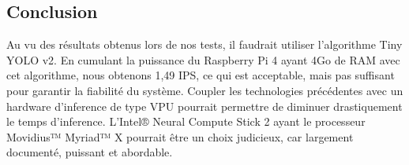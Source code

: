 \subsection{Conclusion}
\label{hwInference_Conclusion}
Au vu des résultats obtenus lors de nos tests, il faudrait utiliser l'algorithme Tiny YOLO v2. En cumulant la puissance du Raspberry Pi 4 ayant 4Go de RAM avec cet algorithme, 
nous obtenons 1,49 IPS, ce qui est acceptable, mais pas suffisant pour garantir la fiabilité du système.
Coupler les technologies précédentes avec un hardware d'\gls{inference} de type \gls{VPU} pourrait permettre de diminuer drastiquement le temps d'\gls{inference}.
L'Intel® Neural Compute Stick 2 \cite{Movidius} ayant le processeur Movidius™ Myriad™ X pourrait être un choix judicieux, car largement documenté, puissant et abordable.